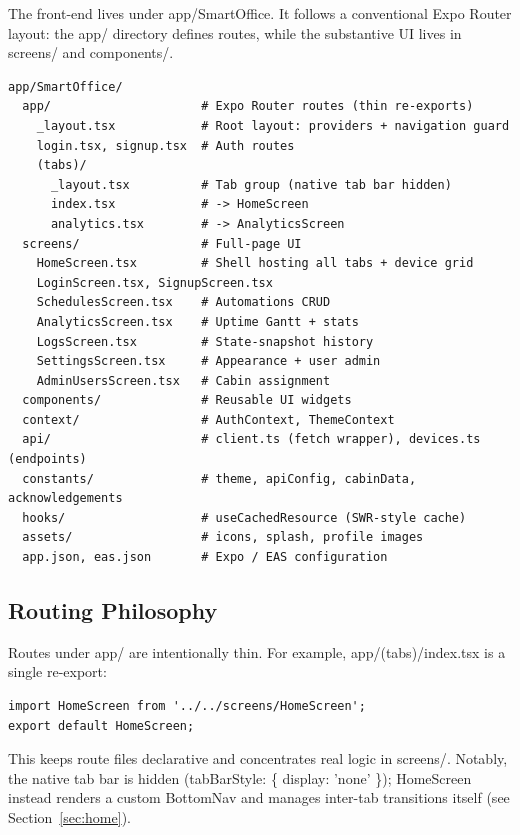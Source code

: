 \documentclass[11pt,a4paper]{article}
\newcommand{\code}[1]{\colorbox{codebg}{\ttfamily\small #1}}
\begin{document}
The front-end lives under \code{app/SmartOffice}. It follows a conventional
Expo Router layout: the \code{app/} directory defines routes, while the
substantive UI lives in \code{screens/} and \code{components/}.

\begin{lstlisting}[language=tsx]
app/SmartOffice/
  app/                     # Expo Router routes (thin re-exports)
    _layout.tsx            # Root layout: providers + navigation guard
    login.tsx, signup.tsx  # Auth routes
    (tabs)/
      _layout.tsx          # Tab group (native tab bar hidden)
      index.tsx            # -> HomeScreen
      analytics.tsx        # -> AnalyticsScreen
  screens/                 # Full-page UI
    HomeScreen.tsx         # Shell hosting all tabs + device grid
    LoginScreen.tsx, SignupScreen.tsx
    SchedulesScreen.tsx    # Automations CRUD
    AnalyticsScreen.tsx    # Uptime Gantt + stats
    LogsScreen.tsx         # State-snapshot history
    SettingsScreen.tsx     # Appearance + user admin
    AdminUsersScreen.tsx   # Cabin assignment
  components/              # Reusable UI widgets
  context/                 # AuthContext, ThemeContext
  api/                     # client.ts (fetch wrapper), devices.ts (endpoints)
  constants/               # theme, apiConfig, cabinData, acknowledgements
  hooks/                   # useCachedResource (SWR-style cache)
  assets/                  # icons, splash, profile images
  app.json, eas.json       # Expo / EAS configuration
\end{lstlisting}

\subsection{Routing Philosophy}

Routes under \code{app/} are intentionally thin. For example,
\code{app/(tabs)/index.tsx} is a single re-export:

\begin{lstlisting}[language=tsx]
import HomeScreen from '../../screens/HomeScreen';
export default HomeScreen;
\end{lstlisting}

This keeps route files declarative and concentrates real logic in
\code{screens/}. Notably, the native tab bar is hidden
(\code{tabBarStyle: \{ display: 'none' \}}); \code{HomeScreen} instead renders a
custom \code{BottomNav} and manages inter-tab transitions itself (see
Section~\ref{sec:home}).

\end{document}
